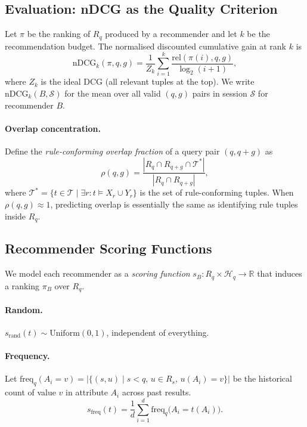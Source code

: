 \subsection{Evaluation: nDCG as the Quality Criterion}
\label{sec:theory:ndcg}

Let $\pi$ be the ranking of $R_q$ produced by a recommender and let $k$ be the
recommendation budget.  The normalised discounted cumulative gain at rank $k$
is
\begin{equation}
  \text{nDCG}_k(\pi, q, g)
  = \frac{1}{Z_k}
    \sum_{i=1}^{k}
    \frac{\text{rel}(\pi(i), q, g)}{\log_2(i+1)},
  \label{eq:ndcg}
\end{equation}
where $Z_k$ is the ideal DCG (all relevant tuples at the top).  We write
$\text{nDCG}_k(B, \mathcal{S})$ for the mean over all valid $(q, g)$ pairs in
session $\mathcal{S}$ for recommender $B$.

\paragraph{Overlap concentration.}
Define the \emph{rule-conforming overlap fraction} of a query pair $(q, q+g)$
as
\begin{equation}
  \rho(q,g)
  = \frac{|R_q \cap R_{q+g} \cap \mathcal{T}^*|}{|R_q \cap R_{q+g}|},
  \label{eq:rho}
\end{equation}
where $\mathcal{T}^* = \{t \in \mathcal{T} \mid \exists r : t \models X_r
\cup Y_r\}$ is the set of rule-conforming tuples.  When $\rho(q,g) \approx 1$,
predicting overlap is essentially the same as identifying rule tuples inside
$R_q$.

\subsection{Recommender Scoring Functions}
\label{sec:theory:scorers}

We model each recommender as a \emph{scoring function}
$s_B : R_q \times \mathcal{H}_q \to \mathbb{R}$ that induces a ranking $\pi_B$
over $R_q$.

\paragraph{Random.}
$s_{\mathrm{rand}}(t) \sim \mathrm{Uniform}(0,1)$, independent of everything.

\paragraph{Frequency.}
Let $\text{freq}_q(A_i = v) = |\{(s, u) \mid s < q,\, u \in R_s,\, u(A_i) = v\}|$
be the historical count of value $v$ in attribute $A_i$ across past results.
\begin{equation}
  s_{\mathrm{freq}}(t) = \frac{1}{d}\sum_{i=1}^d \text{freq}_q\bigl(A_i = t(A_i)\bigr).
  \label{eq:freq-score}
\end{equation}

